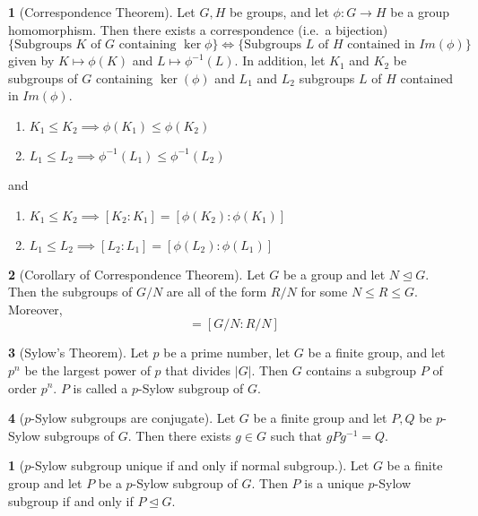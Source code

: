 \documentclass[12pt]{article}
\theoremstyle{definition}
\newtheorem{theorem}{\color{ForestGreen}{\textbf{Theorem}}}
\newtheorem{corollary}{\color{ForestGreen}{\textbf{Corollary}}}
\begin{document}
\begin{theorem}[Correspondence Theorem]
Let $G, H$ be groups, and let $\phi : G \to H$ be a group homomorphism. Then there exists a correspondence (i.e.\ a bijection)
\begin{equation*}
\{\text{Subgroups $K$ of $G$ containing $\ker \phi$}\} \iff \{\text{Subgroups $L$ of $H$ contained in $Im(\phi)$}\}
\end{equation*}
given by $K \mapsto \phi(K)$ and $L \mapsto \phi^{-1}(L)$. In addition, let $K_1$ and $K_2$ be subgroups of $G$ containing $\ker(\phi)$ and $L_1$ and $L_2$ subgroups $L$ of $H$ contained in $Im(\phi)$.
\begin{enumerate}
\item $K_1 \leq K_2 \implies \phi(K_1) \leq \phi(K_2)$
\item $L_1 \leq L_2 \implies \phi^{-1}(L_1) \leq \phi^{-1}(L_2)$
\end{enumerate}
and
\begin{enumerate}
\item $K_1 \leq K_2 \implies [K_2 : K_1] = [\phi(K_2) : \phi(K_1)]$
\item $L_1 \leq L_2 \implies [L_2 : L_1] = [\phi(L_2) : \phi(L_1)]$
\end{enumerate}
\end{theorem}

\begin{theorem}[Corollary of Correspondence Theorem]
Let $G$ be a group and let $N \trianglelefteq G$. Then the subgroups of $G/N$ are all of the form $R/N$ for some $N\leq R\leq G$. Moreover,
\begin{equation}
[G:R] = [G/N:R/N]
\end{equation}
\end{theorem}

\begin{theorem}[Sylow's Theorem]
Let $p$ be a prime number, let $G$ be a finite group, and let $p^n$ be the largest power of $p$ that divides $
|G|$. Then $G$ contains a subgroup $P$ of order $p^n$. $P$ is called a $p$-Sylow subgroup of $G$.
\end{theorem}

\begin{theorem}[$p$-Sylow subgroups are conjugate]
Let $G$ be a finite group and let $P,Q$ be $p$-Sylow subgroups of $G$. Then there exists $g \in G$ such that $gPg^{-1} = Q$.
\end{theorem}

\begin{corollary}[$p$-Sylow subgroup unique if and only if normal subgroup.]
Let $G$ be a finite group and let $P$ be a $p$-Sylow subgroup of $G$. Then $P$ is a unique $p$-Sylow subgroup if and only if $P \trianglelefteq G$.
\end{corollary}
\end{document}
